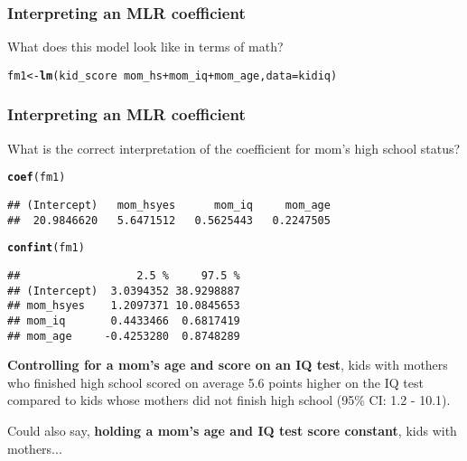 \documentclass[table]{beamer}\usepackage[]{graphicx}\usepackage[]{color}
\makeatletter
\newcommand{\hlopt}[1]{\textcolor[rgb]{0,0,0}{#1}}%
\newcommand{\hlstd}[1]{\textcolor[rgb]{0.345,0.345,0.345}{#1}}%
\newcommand{\hlkwb}[1]{\textcolor[rgb]{0.69,0.353,0.396}{#1}}%
\newcommand{\hlkwc}[1]{\textcolor[rgb]{0.333,0.667,0.333}{#1}}%
\newcommand{\hlkwd}[1]{\textcolor[rgb]{0.737,0.353,0.396}{\textbf{#1}}}%
\newenvironment{kframe}{%
 \def\at@end@of@kframe{}%
 \ifinner\ifhmode%
  \def\at@end@of@kframe{\end{minipage}}%
  \begin{minipage}{\columnwidth}%
 \fi\fi%
 \def\FrameCommand##1{\hskip\@totalleftmargin \hskip-\fboxsep
 \colorbox{shadecolor}{##1}\hskip-\fboxsep
     \hskip-\linewidth \hskip-\@totalleftmargin \hskip\columnwidth}%
 \MakeFramed {\advance\hsize-\width
   \@totalleftmargin\z@ \linewidth\hsize
   \@setminipage}}%
 {\par\unskip\endMakeFramed%
 \at@end@of@kframe}
\newenvironment{knitrout}{}{} %
\makeatother
\begin{document}


\begin{frame}[fragile]
\frametitle{Interpreting an MLR coefficient}

What does this model look like in terms of math?

\scriptsize
\begin{knitrout}
\color{fgcolor}\begin{kframe}
\begin{alltt}
\hlstd{fm1} \hlkwb{<-} \hlkwd{lm}\hlstd{(kid_score} \hlopt{~} \hlstd{mom_hs} \hlopt{+} \hlstd{mom_iq} \hlopt{+} \hlstd{mom_age,} \hlkwc{data}\hlstd{=kidiq)}
\end{alltt}
\end{kframe}
\end{knitrout}


\end{frame}


\begin{frame}[fragile]
\frametitle{Interpreting an MLR coefficient}

What is the correct interpretation of the coefficient for mom's high school status?

\scriptsize
\begin{knitrout}
\color{fgcolor}\begin{kframe}
\begin{alltt}
\hlkwd{coef}\hlstd{(fm1)}
\end{alltt}
\begin{verbatim}
## (Intercept)   mom_hsyes      mom_iq     mom_age 
##  20.9846620   5.6471512   0.5625443   0.2247505
\end{verbatim}
\begin{alltt}
\hlkwd{confint}\hlstd{(fm1)}
\end{alltt}
\begin{verbatim}
##                  2.5 %     97.5 %
## (Intercept)  3.0394352 38.9298887
## mom_hsyes    1.2097371 10.0845653
## mom_iq       0.4433466  0.6817419
## mom_age     -0.4253280  0.8748289
\end{verbatim}
\end{kframe}
\end{knitrout}


{\bf Controlling for a mom's age and score on an IQ test}, kids with mothers who finished high school scored on average 5.6 points higher on the IQ test compared to kids whose mothers did not finish high school (95\% CI: 1.2 - 10.1).

Could also say, {\bf holding a mom's age and IQ test score constant}, kids with mothers...

\end{frame}
\end{document}
